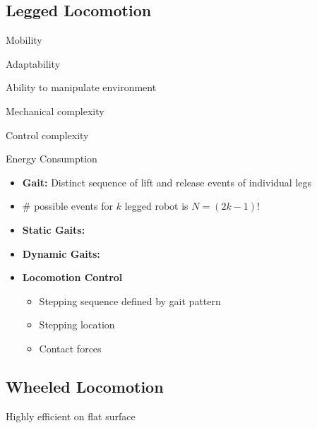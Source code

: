 \documentclass[a4paper]{article}
\newcommand{\ipro}{\item[+]}
\newcommand{\icon}{\item[-]}
\newcommand{\ides}[1]{\item \textbf{#1}}
\begin{document}
\subsection{Legged Locomotion}
\begin{itemize*}
    \ipro Mobility
    \ipro Adaptability
    \ipro Ability to manipulate environment
    \icon Mechanical complexity
    \icon Control complexity
    \icon Energy Consumption
\end{itemize*}
\begin{itemize}
    \ides{Gait:} Distinct sequence of lift and release events of individual legs
    \item $\#$ possible events for $k$ legged robot is $N = (2k - 1)!$
    \ides{Static Gaits:}
    \ides{Dynamic Gaits:}
    \ides{Locomotion Control}
        \begin{itemize}
            \item[1)] Stepping sequence defined by gait pattern
            \item[2)] Stepping location
            \item[3)] Contact forces
        \end{itemize}
\end{itemize}

\subsection{Wheeled Locomotion}
\begin{itemize*}
    \ipro Highly efficient on flat surface
\end{itemize*}
\end{document}
